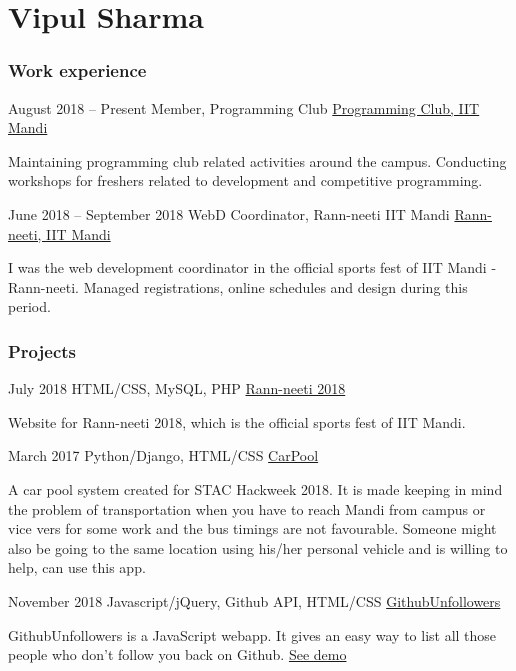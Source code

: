 \documentclass{tccv}
\begin{document}
\part{Vipul Sharma}

\section{Work experience}

\begin{eventlist}

\item{August 2018 -- Present}
     {Member, Programming Club}
     {\href{https://www.facebook.com/prog.iitmandi/}{Programming Club, IIT Mandi}}

Maintaining programming club related activities around the campus. Conducting workshops for freshers related to development and competitive programming.

\item{June 2018 -- September 2018}
     {WebD Coordinator, Rann-neeti IIT Mandi}
     {\href{http://www.rann-neeti.co/}{Rann-neeti, IIT Mandi}}

I was the web development coordinator in the official sports fest of IIT Mandi - Rann-neeti. Managed registrations, online schedules and design during this period.

\end{eventlist}

\section{Projects}

\begin{eventlist}

\item{July 2018}
	{HTML/CSS, MySQL, PHP}
    {\href{https://github.com/vsvipul/Rann-Neeti-2018}{Rann-neeti 2018}}

Website for Rann-neeti 2018, which is the official sports fest of IIT Mandi.

\item{March 2017}
     {Python/Django, HTML/CSS}
     {\href{https://github.com/vsvipul/Car-Pool}{CarPool}}

A car pool system created for STAC Hackweek 2018. It is made keeping in mind the problem of transportation when you have to reach Mandi from campus or vice vers for some work and the bus timings are not favourable. Someone might also be going to the same location using his/her personal vehicle and is willing to help, can use this app.

\item{November 2018}
     {Javascript/jQuery, Github API, HTML/CSS}
     {\href{https://github.com/vsvipul/GithubUnfollowers}{GithubUnfollowers}}


GithubUnfollowers is a JavaScript webapp. It gives an easy way to list all those people who don't follow you back on Github. {\href{https://vsvipul.github.io/GithubUnfollowers/}{See demo}}

\end{eventlist}
\end{document}
